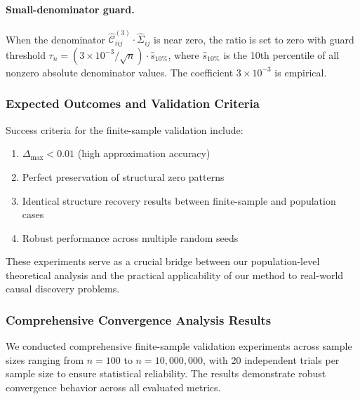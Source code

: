 \documentclass[11pt,a4paper]{article}
\numberwithin{equation}{section}
\begin{document}
\paragraph{Small-denominator guard.}
When the denominator $\hat{\mathcal{C}}^{(3)}_{iij}\cdot\hat\Sigma_{ij}$ is
near zero, the ratio is set to zero with guard threshold
$\tau_n = (3\times10^{-3}/\sqrt{n})\cdot\hat{s}_{10\%}$, where
$\hat{s}_{10\%}$ is the 10th percentile of all nonzero absolute denominator
values.  The coefficient $3\times10^{-3}$ is empirical.

\subsubsection{Expected Outcomes and Validation Criteria}

Success criteria for the finite-sample validation include:
\begin{enumerate}[label=(\arabic*)]
\item $\Delta_{\max} < 0.01$ (high approximation accuracy)
\item Perfect preservation of structural zero patterns
\item Identical structure recovery results between finite-sample and population cases
\item Robust performance across multiple random seeds
\end{enumerate}

These experiments serve as a crucial bridge between our population-level theoretical analysis and the practical applicability of our method to real-world causal discovery problems.

\subsubsection{Comprehensive Convergence Analysis Results}

We conducted comprehensive finite-sample validation experiments across sample sizes ranging from $n = 100$ to $n = 10{,}000{,}000$, with 20 independent trials per sample size to ensure statistical reliability. The results demonstrate robust convergence behavior across all evaluated metrics.
\end{document}
